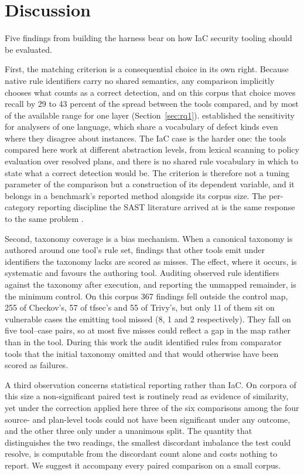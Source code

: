 \documentclass[smallextended]{svjour3}
\begin{document}
\section{Discussion}
\label{sec:discussion}

Five findings from building the harness bear on how IaC security tooling should
be evaluated.

First, the matching criterion is a consequential choice in its own right. Because
native rule identifiers carry no shared semantics, any comparison implicitly
chooses what counts as a correct detection, and on this corpus that choice moves
recall by 29 to 43 percent of the spread between the tools compared, and by most of the available range for one layer
(Section~\ref{sec:rq1}). \citet{habib2018howmany} established the sensitivity for
analysers of one language, which share a vocabulary of defect kinds even where
they disagree about instances. The IaC case is the harder one: the tools compared
here work at different abstraction levels, from lexical scanning to policy
evaluation over resolved plans, and there is no shared rule vocabulary in which
to state what a correct detection would be. The criterion is therefore not a
tuning parameter of the comparison but a construction of its dependent variable,
and it belongs in a benchmark's reported method alongside its corpus size. The
per-category reporting discipline the SAST literature arrived at is the same
response to the same problem \citep{li2023sast}.

Second, taxonomy coverage is a bias mechanism. When a canonical taxonomy is
authored around one tool's rule set, findings that other tools emit under
identifiers the taxonomy lacks are scored as misses. The effect, where it occurs,
is systematic and favours the authoring tool. Auditing observed rule identifiers against the
taxonomy after execution, and reporting the unmapped remainder, is the minimum
control. On this corpus 367 findings fell outside the control map, 255 of
Checkov's, 57 of tfsec's and 55 of Trivy's, but only 11 of them sit on vulnerable
cases the emitting tool missed (8, 1 and 2 respectively). They fall on five
tool--case pairs, so at most five misses could reflect a gap in the map rather
than in the tool. During this work the audit identified rules from comparator tools that
the initial taxonomy omitted and that would otherwise have been scored as
failures.

A third observation concerns statistical reporting rather than IaC. On corpora of
this size a non-significant paired test is routinely read as evidence of
similarity, yet under the correction applied here three of the six comparisons
among the four source- and plan-level tools could not have been significant
under any outcome, and the other three only under a unanimous split. The quantity that distinguishes the two readings, the
smallest discordant imbalance the test could resolve, is computable from the
discordant count alone and costs nothing to report. We suggest it accompany every
paired comparison on a small corpus.
\end{document}
